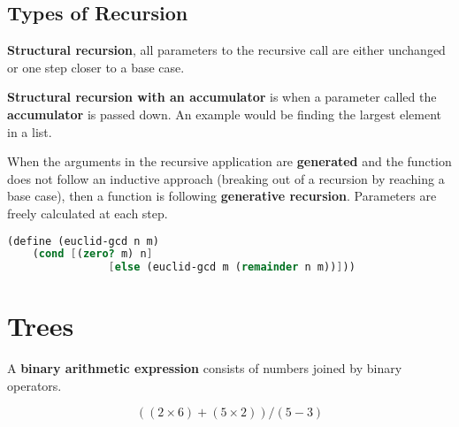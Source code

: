\documentclass[english, 12pt]{article}
\begin{document}
\subsection{Types of Recursion}
\begin{defn}
\textbf{Structural recursion}, all parameters to the recursive call are either unchanged or one step closer to a base case.
\end{defn}
\begin{defn}
\textbf{Structural recursion with an accumulator} is when a parameter called the \textbf{accumulator} is passed down. An example would be finding the largest element in a list.
\end{defn}
\begin{defn}
When the arguments in the recursive application are \textbf{generated} and the function does not follow an inductive approach (breaking out of a recursion by reaching a base case), then a function is following \textbf{generative recursion}. Parameters are freely calculated at each step.
\begin{lstlisting}[language=Scheme]
(define (euclid-gcd n m)
	(cond [(zero? m) n]
				[else (euclid-gcd m (remainder n m))]))
\end{lstlisting}
\end{defn}
\section{Trees}
\begin{defn}
A \textbf{binary arithmetic expression} consists of numbers joined by binary operators.
\end{defn}
\begin{exmp}
\[((2\times 6) + (5 \times 2))/(5-3) \]
\begin{center}
  \end{center}
\end{exmp}
\end{document}
